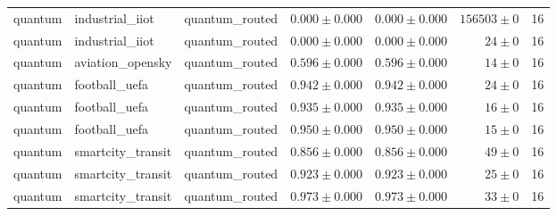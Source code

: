 \begin{table}[htbp]
\begin{tabular}{l l l r r r r}
quantum & industrial\_iiot & quantum\_routed & $0.000\pm0.000$ & $0.000\pm0.000$ & $156503\pm0$ & 16 \\
quantum & industrial\_iiot & quantum\_routed & $0.000\pm0.000$ & $0.000\pm0.000$ & $24\pm0$ & 16 \\
quantum & aviation\_opensky & quantum\_routed & $0.596\pm0.000$ & $0.596\pm0.000$ & $14\pm0$ & 16 \\
quantum & football\_uefa & quantum\_routed & $0.942\pm0.000$ & $0.942\pm0.000$ & $24\pm0$ & 16 \\
quantum & football\_uefa & quantum\_routed & $0.935\pm0.000$ & $0.935\pm0.000$ & $16\pm0$ & 16 \\
quantum & football\_uefa & quantum\_routed & $0.950\pm0.000$ & $0.950\pm0.000$ & $15\pm0$ & 16 \\
quantum & smartcity\_transit & quantum\_routed & $0.856\pm0.000$ & $0.856\pm0.000$ & $49\pm0$ & 16 \\
quantum & smartcity\_transit & quantum\_routed & $0.923\pm0.000$ & $0.923\pm0.000$ & $25\pm0$ & 16 \\
quantum & smartcity\_transit & quantum\_routed & $0.973\pm0.000$ & $0.973\pm0.000$ & $33\pm0$ & 16 \\
\hline
\end{tabular}
\end{table}
